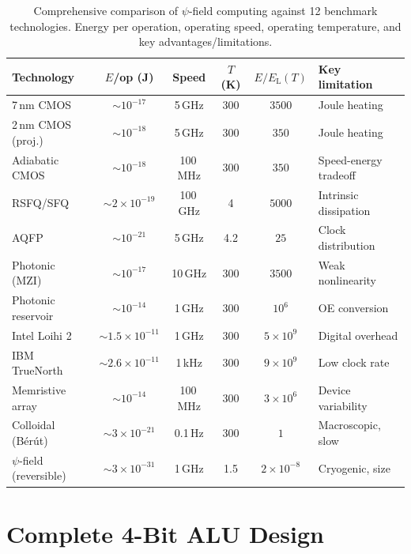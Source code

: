 \documentclass[11pt,twocolumn]{article}
\theoremstyle{definition}
\theoremstyle{remark}
\newcommand{\EL}{E_{\mathrm{L}}}
\begin{document}
\begin{table}[t]
\centering
\caption{Comprehensive comparison of $\psi$-field computing against 12
benchmark technologies. Energy per operation, operating speed, operating
temperature, and key advantages/limitations.}
\label{tab:comprehensive}
\begin{tabular}{@{}lccccl@{}}
\toprule
\textbf{Technology} & \textbf{$E$/op (J)} & \textbf{Speed} & \textbf{$T$ (K)} &
\textbf{$E/\EL(T)$} & \textbf{Key limitation} \\
\midrule
7\,nm CMOS & $\sim 10^{-17}$ & 5\,GHz & 300 & $3500$ & Joule heating \\
2\,nm CMOS (proj.) & $\sim 10^{-18}$ & 5\,GHz & 300 & $350$ & Joule heating \\
Adiabatic CMOS & $\sim 10^{-18}$ & 100\,MHz & 300 & $350$ & Speed-energy tradeoff \\
RSFQ/SFQ & $\sim 2\times 10^{-19}$ & 100\,GHz & 4 & $5000$ & Intrinsic dissipation \\
AQFP & $\sim 10^{-21}$ & 5\,GHz & 4.2 & $25$ & Clock distribution \\
Photonic (MZI) & $\sim 10^{-17}$ & 10\,GHz & 300 & $3500$ & Weak nonlinearity \\
Photonic reservoir & $\sim 10^{-14}$ & 1\,GHz & 300 & $10^6$ & OE conversion \\
Intel Loihi 2 & $\sim 1.5\times 10^{-11}$ & 1\,GHz & 300 & $5\times 10^9$ & Digital overhead \\
IBM TrueNorth & $\sim 2.6\times 10^{-11}$ & 1\,kHz & 300 & $9\times 10^9$ & Low clock rate \\
Memristive array & $\sim 10^{-14}$ & 100\,MHz & 300 & $3\times 10^6$ & Device variability \\
Colloidal (B\'er\'ut) & $\sim 3\times 10^{-21}$ & 0.1\,Hz & 300 & $1$ & Macroscopic, slow \\
\midrule
$\psi$-field (reversible) & $\sim 3\times 10^{-31}$ & 1\,GHz & 1.5 & $2\times 10^{-8}$ & Cryogenic, size \\
\bottomrule
\end{tabular}
\end{table}

\section{Complete 4-Bit ALU Design}\label{sec:alu}
\end{document}
